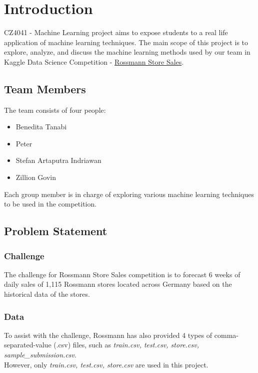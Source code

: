 \chapter{Introduction}
CZ4041 - Machine Learning project aims to expose students to a real life application of machine learning techniques. The main scope of this project is to explore, analyze, and discuss the machine learning methods used by our team in Kaggle Data Science Competition - \href{https://www.kaggle.com/c/rossmann-store-sales}{Rossmann Store Sales}.


\section{Team Members}
The team consists of four people:
\begin{itemize}
	\item Benedita Tanabi
	\item Peter
	\item Stefan Artaputra Indriawan
	\item Zillion Govin
\end{itemize}
Each group member is in charge of exploring various machine learning techniques to be used in the competition.

\section{Problem Statement}

\subsection{Challenge}
The challenge for Rossmann Store Sales competition is to forecast 6 weeks of daily sales of 1,115 Rossmann stores located across Germany based on the historical data of the stores.

\subsection{Data}
To assist with the challenge, Rossmann has also provided 4 types of comma-separated-value (.csv) files, such as \textit{train.csv, test.csv, store.csv, sample\_submission.csv}.\\
However, only \textit{train.csv, test.csv, store.csv} are used in this project.

